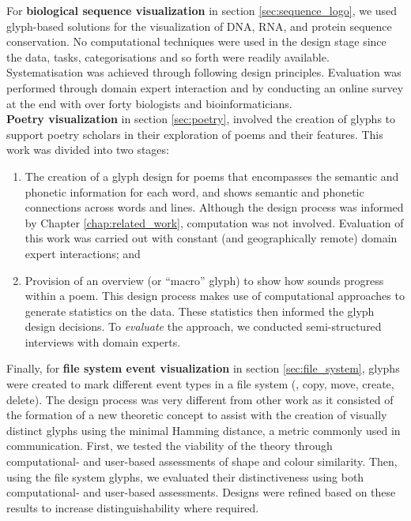 For \textbf{biological sequence visualization} in section \ref{sec:sequence_logo}, we used glyph-based solutions for the visualization of DNA, RNA, and protein sequence conservation.
No computational techniques were used in the design stage since the data, tasks, categorisations and so forth were readily available. 
Systematisation was achieved through following design principles.
Evaluation was performed through domain expert interaction and by conducting an online survey at the end with over forty biologists and bioinformaticians.\\

\textbf{Poetry visualization} in section \ref{sec:poetry}, involved the creation of glyphs to support poetry scholars in their exploration of poems and their features.
This work was divided into two stages:

\begin{enumerate}

\item The creation of a glyph design for poems that encompasses the semantic and phonetic information for each word, and shows semantic and phonetic connections across words and lines.
Although the design process was informed by Chapter \ref{chap:related_work}, computation was not involved.
Evaluation of this work was carried out with constant (and geographically remote) domain expert interactions; and

\item Provision of an overview (or ``macro'' glyph) to show how sounds progress within a poem.
This design process makes use of computational approaches to generate statistics on the data.
These statistics then informed the glyph design decisions.
To \emph{evaluate} the approach, we conducted semi-structured interviews with domain experts.

\end{enumerate}

Finally, for \textbf{file system event visualization} in section \ref{sec:file_system}, glyphs were created to mark different event types in a file system (\eg, copy, move, create, delete).
The design process was very different from other work as it consisted of the formation of a new theoretic concept to assist with the creation of visually distinct glyphs using the minimal Hamming distance, a metric commonly used in communication.
First, we tested the viability of the theory through computational- and user-based assessments of shape and colour similarity.
Then, using the file system glyphs, we evaluated their distinctiveness using both computational- and user-based assessments.
Designs were refined based on these results to increase distinguishability where required.


